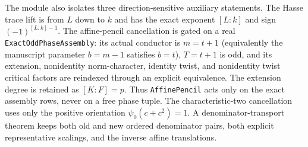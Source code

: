 \begin{theorem}
The module also isolates three direction-sensitive auxiliary statements.
The Hasse trace lift is from $L$ down to $k$ and has the exact exponent
$[L:k]$ and sign $(-1)^{[L:k]-1}$.  The affine-pencil cancellation is gated
on a real \texttt{ExactOddPhaseAssembly}: its actual conductor is
$m=t+1$ (equivalently the manuscript parameter $b=m-1$ satisfies $b=t$),
$T=t+1$ is odd, and its extension, nonidentity norm-character, identity
twist, and nonidentity twist critical factors are reindexed through an
explicit equivalence.  The extension degree is retained as $[K:F]=p$.
Thus \texttt{AffinePencil} acts only on the exact assembly rows, never on a
free phase tuple.  The
characteristic-two cancellation uses only the positive orientation
$\psi_0(c+c^2)=1$.  A denominator-transport theorem keeps both old and new
ordered denominator pairs, both explicit representative scalings, and the
inverse affine translations.


\end{theorem}
